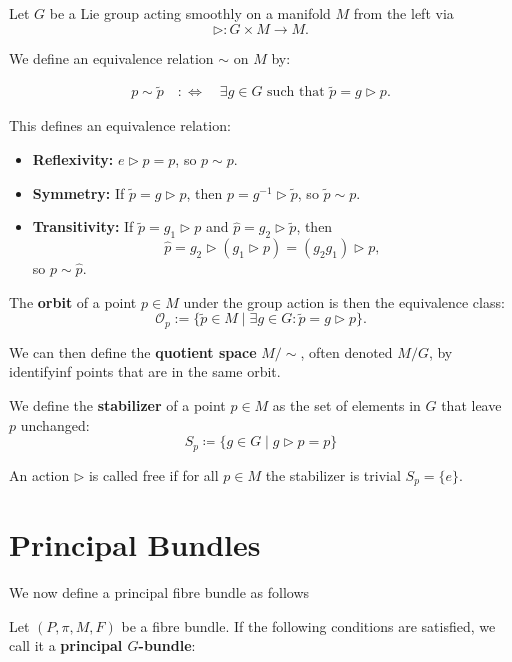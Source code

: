Let \( G \) be a Lie group acting smoothly on a manifold \( M \) from the left via
\[
\triangleright : G \times M \longrightarrow M.
\]

We define an equivalence relation \( \sim \) on \( M \) by:

\begin{align*}
p \sim \tilde{p} \quad :\Longleftrightarrow \quad \exists g \in G \text{ such that } \tilde{p} = g \triangleright p.
\end{align*}

This defines an equivalence relation:
\begin{itemize}
  \item \textbf{Reflexivity:} \( e \triangleright p = p \), so \( p \sim p \).
  \item \textbf{Symmetry:} If \( \tilde{p} = g \triangleright p \), then \( p = g^{-1} \triangleright \tilde{p} \), so \( \tilde{p} \sim p \).
  \item \textbf{Transitivity:} If \( \tilde{p} = g_1 \triangleright p \) and \( \hat{p} = g_2 \triangleright \tilde{p} \), then
  \[
  \hat{p} = g_2 \triangleright (g_1 \triangleright p) = (g_2 g_1) \triangleright p,
  \]
  so \( p \sim \hat{p} \).
\end{itemize}

The \textbf{orbit} of a point \( p \in M \) under the group action is then the equivalence class:
\[
\mathcal{O}_p := \{ \tilde{p} \in M \mid \exists g \in G : \tilde{p} = g \triangleright p \}.
\]

We can then define the \textbf{quotient space} \( M/\!\sim \), often denoted \( M/G \), by identifyinf points that are in the same orbit.

We define the \textbf{stabilizer} of a point \( p \in M \) as the set of elements in \( G \) that leave \( p \) unchanged:
\[ S_p \coloneqq \{g \in G \mid g \triangleright p = p \} \]

An action $\triangleright$ is called free if for all \( p \in M \) the stabilizer is trivial \( S_p = \{e\} \).





\section{Principal Bundles}

We now define a principal fibre bundle as follows \cite{FredericSchullerPrincipalfibrebundlesLec19FredericSchuller2015} 

Let \( (P, \pi, M, F) \) be a fibre bundle. If the following conditions are satisfied, we call it a \textbf{principal \( G \)-bundle}:

